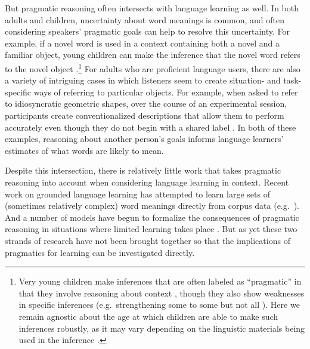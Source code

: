 \documentclass{article} %
\begin{document}
But pragmatic reasoning often intersects with language learning as
well. In both adults and children, uncertainty about word meanings is
common, and often considering speakers' pragmatic goals can help to resolve this uncertainty. For example,
if a novel word is used in a context containing both a novel and a
familiar object, young children can make the inference
that the novel word refers to the novel object \cite{markman1988}.\footnote{Very young children
  make inferences that are often labeled as ``pragmatic'' in that they
  involve reasoning about context \cite{clark1988,baldwin1993}, though
  they also show weaknesses in specific inferences (e.g.~strengthening
  {\sc some} to {\sc some but not all} \cite{papafragou2003}). Here we
  remain agnostic about the age at which children are able to make
  such inferences robustly, as it may vary depending on the linguistic
  materials being used in the inference \cite{barner2011}.} For adults
who are proficient language users, there are also a variety of intriguing cases
in which listeners seem to create situation- and task-specific ways of
referring to particular objects. For example, when asked to refer to
idiosyncratic geometric shapes, over the course of an experimental
session, participants create conventionalized descriptions that allow
them to perform accurately even though they do not begin with a shared
label \cite{krauss1964,clark1986}. In both of these examples, reasoning about another person's goals informs language learners' estimates of what words are likely to mean. 


Despite this intersection, there is relatively little work that takes pragmatic reasoning into account when considering language learning in context. Recent work on grounded language learning has attempted to learn large sets of (sometimes relatively complex) word meanings directly from corpus data
(e.g.~\cite{zettlemoyer2005,chen2008,frank2009,kwiatkowski2010,johnson2012}). And
a number of models have begun to formalize the consequences of
pragmatic reasoning in situations where limited learning takes place
\cite{golland2010,frank2012,bergen2012}. But as yet these two strands
of research have not been brought together so that the implications of
pragmatics for learning can be investigated directly.
\end{document}
